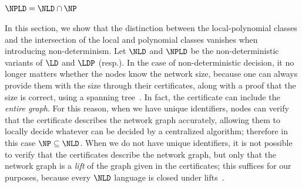 \subsection{$\NPLD = \NLD \cap \NP$}
In this section, we show that the distinction between the local-polynomial classes and the intersection of the local and polynomial classes vanishes when introducing non-determinism. Let $\NLD$ and $\NPLD$ be the non-deterministic variants of $\LD$ and $\LDP$ (resp.). In the case of non-deterministic decision, it no longer matters whether the nodes know the network size, because one can always provide them with the size through their certificates, along with a proof that the size is correct, using a spanning tree~\cite{korman2005proof}.
In fact, the certificate can include the \emph{entire graph}.
For this reason, when we have unique identifiers, nodes can verify that the certificate
describes the network graph accurately, allowing them to locally decide whatever can be decided by a centralized algorithm;
therefore in this case
$\NP \subseteq \NLD$.
When we do not have unique identifiers, it is not possible to verify that the certificates describe the network graph,
but only that the network graph is a \emph{lift} of the graph given in the certificates;
this suffices for our purposes, because every $\NLD$ language is closed under lifts~\cite{fraigniaud2013can}.

